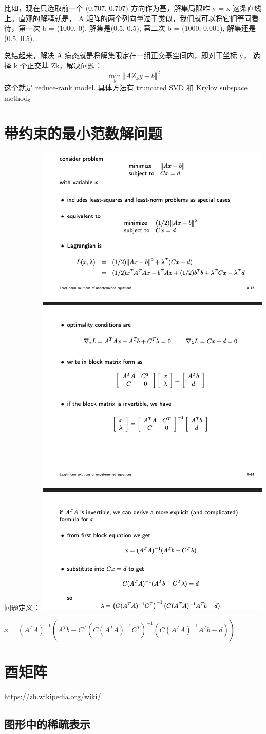 比如，现在只选取前一个 (0.707, 0.707) 方向作为基，解集局限咋 y = x 这条直线上。直观的解释就是， A 矩阵的两个列向量过于类似，我们就可以将它们等同看待，第一次 b = (1000, 0), 解集是(0.5, 0.5), 第二次 b = (1000, 0.001), 解集还是 (0.5, 0.5).

总结起来，解决 A 病态就是将解集限定在一组正交基空间内，即对于坐标 y， 选择 k 个正交基 Zk，解决问题：$$\min_{y}\Vert AZ_ky - b \Vert ^2$$
这个就是 reduce-rank model. 具体方法有 truncated SVD 和 Krylov subspace method。
\section{带约束的最小范数解问题}
问题定义：
\includegraphics{MathTools/assets/rinv_with_constraints.png}
\begin{theorembox}
	$x = (A^TA)^{-1}(A^Tb-C^T(C(A^TA)^{-1}C^T)^{-1}(C(A^TA)^{-1}A^Tb-d))$
\end{theorembox}
\section{酉矩阵}
https://zh.wikipedia.org/wiki/%
\subsection{图形中的稀疏表示}
